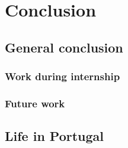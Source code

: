 
\chapter{Conclusion}
\label{chapter:conclusion}

\section{General conclusion}
\subsection{Work during internship}
\subsection{Future work}

\section{Life in Portugal}